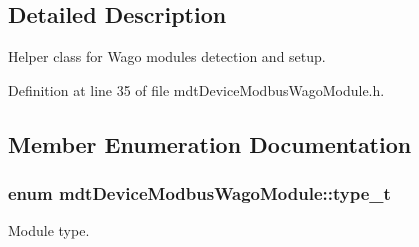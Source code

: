 \subsection{Detailed Description}
Helper class for Wago modules detection and setup. 

Definition at line 35 of file mdt\-Device\-Modbus\-Wago\-Module.\-h.



\subsection{Member Enumeration Documentation}
\hypertarget{classmdt_device_modbus_wago_module_a2d8f6895b2a031c953bd91c2f65a1a25}{
\subsubsection[{type\-\_\-t}]{\setlength{\rightskip}{0pt plus 5cm}enum {\bf mdt\-Device\-Modbus\-Wago\-Module\-::type\-\_\-t}}}\label{classmdt_device_modbus_wago_module_a2d8f6895b2a031c953bd91c2f65a1a25}


Module type. 

